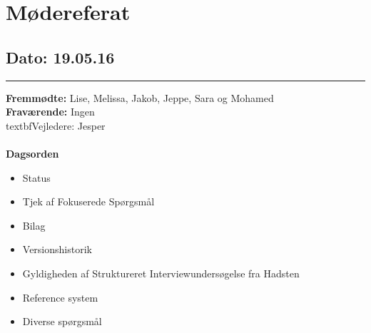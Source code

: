 \chapter{Mødereferat}

\section{Dato: 19.05.16}
\hrule

\textbf{Fremmødte:} Lise, Melissa, Jakob, Jeppe, Sara og Mohamed \\
\textbf{Fraværende:} Ingen
\\textbf{Vejledere:} Jesper
\\
\\
\textbf{Dagsorden}
\begin{itemize}
	\item Status
	\item Tjek af Fokuserede Spørgsmål
	\item Bilag
	\item Versionshistorik
	\item Gyldigheden af Struktureret Interviewundersøgelse fra Hadsten
	\item Reference system
	\item Diverse spørgsmål 
\end{itemize}


